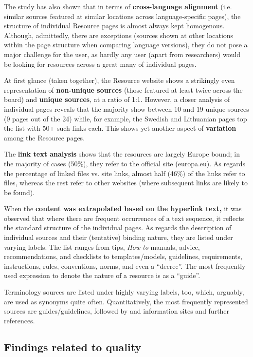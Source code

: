 \documentclass[output=paper]{langsci/langscibook}
\begin{document}
The study has also shown that in terms of \textbf{cross-language alignment} (i.e. similar sources featured at similar locations across language-specific pages), the structure of individual Resource pages is almost always kept homogenous. Although, admittedly, there are exceptions (sources shown at other locations within the page structure when comparing language versions), they do not pose a major challenge for the user, as hardly any user (apart from researchers) would be looking for resources across a great many of individual pages.

At first glance (taken together), the Resource website shows a strikingly even representation of \textbf{non-unique sources} (those featured at least twice across the board) and \textbf{unique sources}, at a ratio of 1:1. However, a closer analysis of individual pages reveals that the majority show between 10 and 19 unique sources (9 pages out of the 24) while, for example, the Swedish and Lithuanian pages top the list with 50+ such links each. This shows yet another aspect of \textbf{variation} among the Resource pages.

The \textbf{link text analysis} shows that the resources are largely Europe bound; in the majority of cases (50\%), they refer to the  official site (europa.eu). As regards the percentage of linked files vs. site links, almost half (46\%) of the links refer to files, whereas the rest refer to other websites (where subsequent links are likely to be found). 

\newpage 
When the \textbf{content was extrapolated based on the hyperlink text,} it was observed that where there are frequent occurrences of a text sequence, it reflects the standard structure of the individual pages. As regards the description of individual sources and their (tentative) binding nature, they are listed under varying labels. The list ranges from tips, \textit{How to} manuals, advice, recommendations, and checklists to templates/models, guidelines, requirements, instructions, rules, conventions, norms, and even a “decree”. The most frequently used expression to denote the nature of a resource is as a “guide”.

Terminology sources are listed under highly varying labels, too, which, arguably, are used as synonyms quite often. Quantitatively, the most frequently represented sources are guides/guidelines, followed by  and information sites and further references.

\subsection{Findings related to quality}\label{sec:svoboda:5.2}
\end{document}
